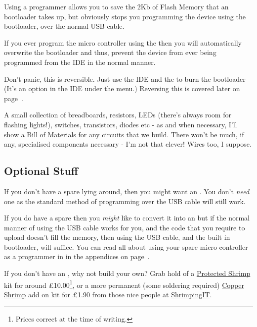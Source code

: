 Using a programmer allows you to save the 2Kb of Flash Memory that an   bootloader takes up, but obviously stops you programming the device using the bootloader, over the normal USB cable.

\begin{note}
	If you ever program the micro controller using the  then you will automatically overwrite the bootloader and thus, prevent the device from ever being programmed from the  IDE in the normal manner.
	
	Don't panic, this is reversible. Just use the  IDE and the  to burn the bootloader (It's an option in the IDE under the  menu.) Reversing this is covered later on page~\pageref{reburn-the-bootloader}.
\end{note}	

A small collection of breadboards, resistors, LEDs (there's always room for flashing lights!), switches, transistors, diodes etc - as and when necessary, I'll show a Bill of Materials for any circuits that we build. There won't be much, if any, specialised components necessary - I'm not that clever! Wires too, I suppose.

\subsection{Optional Stuff}\label{optional-stuff}

If you don't have a spare   lying around, then you might want an . You don't \emph{need} one as the standard   method of programming over the USB cable will still work.

If you do have a spare  then you \emph{might} like to convert it into an  but if the normal manner of using the USB cable works for you, and the code that you require to upload doesn't fill the memory, then using the USB cable, and the built in  bootloader, will suffice. You can read all about using your spare micro controller as a programmer in  in the appendices on page~\pageref{using-an-arduino-as-an-isp-programmer}.

If you don't have an , why not build your own? Grab hold of a \href{http://start.shrimping.it/project/protected/build.html}{Protected Shrimp} kit for around £10.00\footnote{Prices correct at the time of writing.}, or a more permanent (some soldering required) \href{http://start.shrimping.it/kit/stripboard.html}{Copper Shrimp} add on kit for £1.90 from those nice people at \href{http://start.shrimping.it//index.html}{ShrimpingIT}. 

